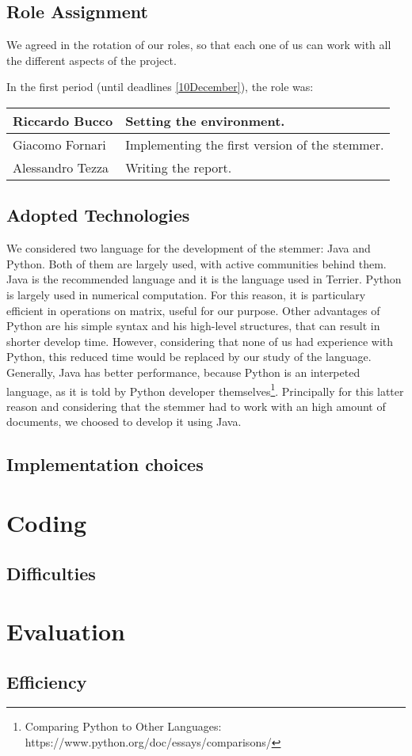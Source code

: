 \documentclass[10pt,a4paper]{article}
\begin{document}
\subsection{Role Assignment}
We agreed in the rotation of our roles, so that each one of us can work with all the different aspects of the project. 

In the first period (until deadlines \ref{10December}), the role was:

\begin{center}
    \begin{tabular}{| l | l |}
    \hline
	Riccardo Bucco & Setting the environment. \\ \hline
	Giacomo Fornari & Implementing the first version of the stemmer. \\ \hline
	Alessandro Tezza & Writing the report. \\ \hline
    \end{tabular}
\end{center}


\subsection{Adopted Technologies}
We considered two language for the development of the stemmer: Java and Python. Both of them are largely used, with active communities behind them. Java is the recommended language and it is the language used in Terrier. Python is largely used in numerical computation. For this reason, it is particulary efficient in operations on matrix, useful for our purpose. Other advantages of Python are his simple syntax and his high-level structures, that can result in shorter develop time. However, considering that none of us had experience with Python, this reduced time would be replaced by our study of the language. 
Generally, Java has better performance, because Python is an interpeted language, as it is told by Python developer themselves\footnote{Comparing Python to Other Languages: https://www.python.org/doc/essays/comparisons/}. Principally for this latter reason and considering that the stemmer had to work with an high amount of documents, we choosed to develop it using Java.
\subsection{Implementation choices}

\section{Coding}
\subsection{Difficulties}

\section{Evaluation}
\subsection{Efficiency}
\end{document}
